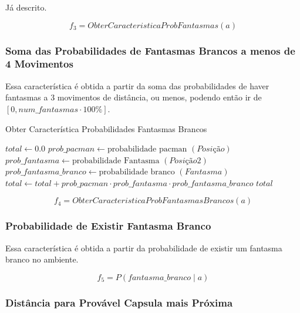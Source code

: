 Já descrito.

$$ f_3 = ObterCaracteristicaProbFantasmas \left( a \right) $$

\subsubsection*{Soma das Probabilidades de Fantasmas Brancos a menos de 4 Movimentos}

Essa característica é obtida a partir da soma das probabilidades de haver fantasmas a 3 movimentos de distância, ou menos, podendo então ir de $ \left[ 0, num\_fantasmas \cdot 100\% \right] $.

\begin{algorithm}[H]
	\caption{Obter Característica Probabilidades Fantasmas Brancos} \label{algorithm:ObterCaracteristicaProbabilidadesFantasmasBrancos}
	\begin{algorithmic}[1]
			\State $\textit{total} \gets 0.0 $
						\State $\textit{prob\_pacman} \gets \text{probabilidade pacman } \left( \textit{Posição} \right) $
							\State $\textit{prob\_fantasma} \gets \text{probabilidade Fantasma } \left( \textit{Posição2} \right) $
							\State $\textit{prob\_fantasma\_branco} \gets \text{probabilidade branco } \left( \textit{Fantasma} \right) $
							\State $\textit{total} \gets \textit{total} + \textit{prob\_pacman}  \cdot \textit{prob\_fantasma} \cdot \textit{prob\_fantasma\_branco} $
						\EndFor
					\EndIf
				\EndFor
			\EndFor
			\State \Return $ \textit{total} $
		\EndProcedure
	\end{algorithmic}
\end{algorithm}

$$ f_4 = ObterCaracteristicaProbFantasmasBrancos \left( a \right) $$

\subsubsection*{Probabilidade de Existir Fantasma Branco}

Essa característica é obtida a partir da probabilidade de existir um fantasma branco no ambiente.

$$ f_5 = P \left( fantasma\_branco \mid a \right) $$

\subsubsection*{Distância para Provável Capsula mais Próxima} \label{oi}

